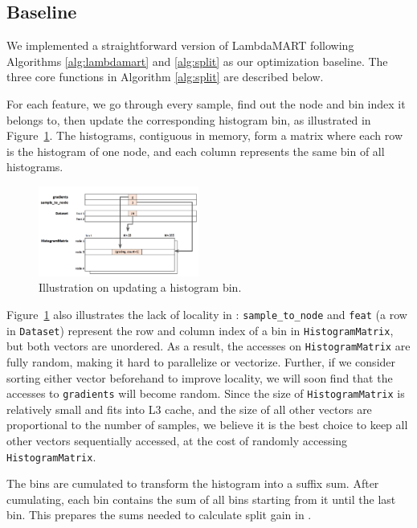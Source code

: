 
\subsection{Baseline}
We implemented a straightforward version of LambdaMART following Algorithms \ref{alg:lambdamart} and \ref{alg:split} as our optimization baseline. The three core functions in Algorithm \ref{alg:split} are described below.

\mypar{\update}
For each feature, we go through every sample, find out the node and bin index it belongs to, then update the corresponding histogram bin, as illustrated in Figure~\ref{fig:baseline}. The histograms, contiguous in memory, form a matrix where each row is the histogram of one node, and each column represents the same bin of all histograms.

\begin{figure}[h]
  \includegraphics[width=0.47\textwidth]{fig/fig_v0.png}
  \caption{Illustration on updating a histogram bin.}
  \label{fig:baseline}
\end{figure}

Figure~\ref{fig:baseline} also illustrates the lack of locality in \update: \texttt{sample\_to\_node} and \texttt{feat} (a row in \texttt{Dataset}) represent the row and column index of a bin in \texttt{HistogramMatrix}, but both vectors are unordered. As a result, the accesses on \texttt{HistogramMatrix} are fully random, making it hard to parallelize or vectorize. Further, if we consider sorting either vector beforehand to improve locality, we will soon find that the accesses to \texttt{gradients} will become random. Since the size of \texttt{HistogramMatrix} is relatively small and fits into L3 cache, and the size of all other vectors are proportional to the number of samples, we believe it is the best choice to keep all other vectors sequentially accessed, at the cost of randomly accessing \texttt{HistogramMatrix}.

\mypar{\cumulate}
The bins are cumulated to transform the histogram into a suffix sum. After cumulating, each bin contains the sum of all bins starting from it until the last bin. This prepares the sums needed to calculate split gain in \getbestsplit.

